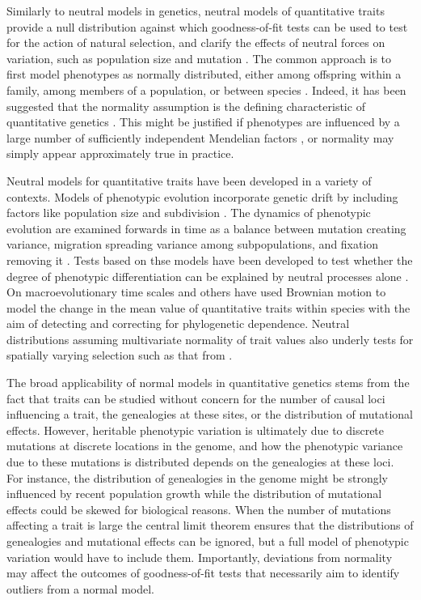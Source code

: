 Similarly to neutral models in genetics, neutral models of quantitative traits
provide a null distribution against which goodness-of-fit tests can be used to
test for the action of natural selection\citep{Lande1976}, and clarify the
effects of neutral forces on variation, such as population size and mutation
\citep{Lynch1986}. The common approach is to first model phenotypes as normally
distributed, either among offspring within a family, among members of a
population, or between species \citep{Turelli2017}. Indeed, it has been
suggested that the normality assumption is the defining characteristic of
quantitative genetics \citep{Rice2004}. This might be justified if phenotypes
are influenced by a large number of sufficiently independent Mendelian factors
\citep{Fisher1918}, or normality may simply appear approximately true in
practice.

Neutral models for quantitative traits have been developed in a variety of
contexts. Models of phenotypic evolution incorporate genetic drift by including
factors like population size and subdivision
\citep{Lande1976,Chakraborty1982,Lynch1986}. The dynamics of phenotypic
evolution are examined forwards in time as a balance between mutation creating
variance, migration spreading variance among subpopulations, and fixation
removing it \citep{Lande1992}. Tests based on thse models have been developed to
test whether the degree of phenotypic differentiation can be explained by
neutral processes alone \citep{Turelli1988}. On macroevolutionary time scales
\citet{Freckleton2002} and others have used Brownian motion to model the change
in the mean value of quantitative traits within species with the aim of
detecting and correcting for phylogenetic dependence. Neutral distributions
assuming multivariate normality of trait values also underly tests for spatially
varying selection such as that from \citet{Ovaskainen2011}.

The broad applicability of normal models in quantitative genetics stems from the
fact that traits can be studied without concern for the number of causal loci
influencing a trait, the genealogies at these sites, or the distribution of
mutational effects. However, heritable phenotypic variation is ultimately due to
discrete mutations at discrete locations in the genome, and how the phenotypic
variance due to these mutations is distributed depends on the genealogies at
these loci. For instance, the distribution of genealogies in the genome might be
strongly influenced by recent population growth while the distribution of
mutational effects could be skewed for biological reasons. When the number of
mutations affecting a trait is large the central limit theorem ensures that the
distributions of genealogies and mutational effects can be ignored, but a full
model of phenotypic variation would have to include them. Importantly,
deviations from normality may affect the outcomes of goodness-of-fit tests that
necessarily aim to identify outliers from a normal model.

